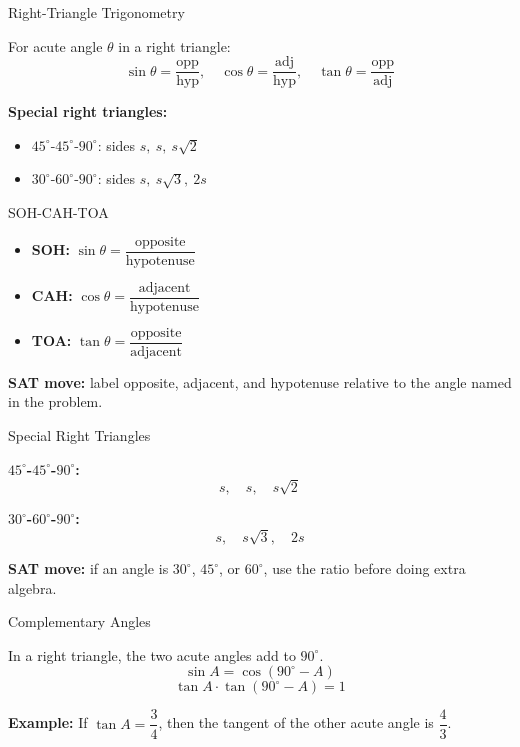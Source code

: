 \documentclass{beamer}
\begin{document}
\begin{frame}{Right-Triangle Trigonometry}

For acute angle $\theta$ in a right triangle:
\[
\sin \theta = \frac{\text{opp}}{\text{hyp}}, \quad
\cos \theta = \frac{\text{adj}}{\text{hyp}}, \quad
\tan \theta = \frac{\text{opp}}{\text{adj}}
\]

\vspace{0.15cm}
\textbf{Special right triangles:}
\begin{itemize}
    \item $45^\circ$-$45^\circ$-$90^\circ$: sides $s,\ s,\ s\sqrt{2}$
    \item $30^\circ$-$60^\circ$-$90^\circ$: sides $s,\ s\sqrt{3},\ 2s$
\end{itemize}

\end{frame}

\begin{frame}{SOH-CAH-TOA}

\begin{itemize}
    \item \textbf{SOH:} $\sin\theta=\dfrac{\text{opposite}}{\text{hypotenuse}}$
    \item \textbf{CAH:} $\cos\theta=\dfrac{\text{adjacent}}{\text{hypotenuse}}$
    \item \textbf{TOA:} $\tan\theta=\dfrac{\text{opposite}}{\text{adjacent}}$
\end{itemize}

\vspace{0.2cm}
\textbf{SAT move:} label opposite, adjacent, and hypotenuse relative to the angle named in the problem.

\end{frame}

\begin{frame}{Special Right Triangles}

\textbf{$45^\circ$-$45^\circ$-$90^\circ$:}
\[
s,\quad s,\quad s\sqrt{2}
\]

\textbf{$30^\circ$-$60^\circ$-$90^\circ$:}
\[
s,\quad s\sqrt{3},\quad 2s
\]

\vspace{0.2cm}
\textbf{SAT move:} if an angle is $30^\circ$, $45^\circ$, or $60^\circ$, use the ratio before doing extra algebra.

\end{frame}

\begin{frame}{Complementary Angles}

In a right triangle, the two acute angles add to $90^\circ$.
\[
\sin A = \cos(90^\circ-A)
\]
\[
\tan A \cdot \tan(90^\circ-A)=1
\]

\vspace{0.2cm}
\textbf{Example:} If $\tan A=\dfrac{3}{4}$, then the tangent of the other acute angle is $\dfrac{4}{3}$.

\end{frame}
\end{document}
